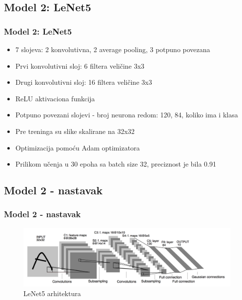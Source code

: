\documentclass{beamer}
\begin{document}
\subsection{Model 2: LeNet5}
\begin{frame}
\frametitle{Model 2: LeNet5}

\begin{itemize}
\item 7 slojeva: 2 konvolutivna, 2 average pooling, 3 potpuno povezana
\item Prvi konvolutivni sloj: 6 filtera veličine 3x3
\item Drugi konvolutivni sloj: 16 filtera veličine 3x3
\item ReLU aktivaciona funkcija
\item Potpuno povezani slojevi - broj neurona redom: 120, 84, koliko ima i klasa 
\item Pre treninga su slike skalirane na 32x32
\item Optimizacija pomoću Adam optimizatora
\item Prilikom učenja u 30 epoha sa batch size 32, preciznost je bila 0.91
\end{itemize}


\end{frame}



\subsection{Model 2 - nastavak}
\begin{frame}
\frametitle{Model 2 - nastavak}

\begin{figure}
\includegraphics[scale=0.30]{lenet5_prez.png}
\caption{LeNet5 arhitektura}
\end{figure}

\end{frame}


\end{document}
